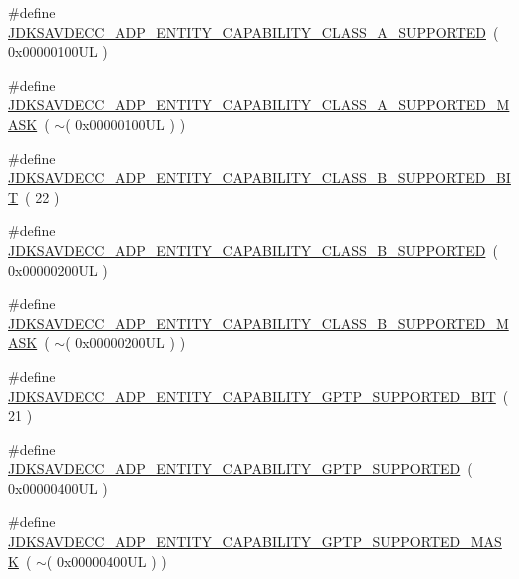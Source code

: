 \begin{DoxyCompactItemize}
\item 
\#define \hyperlink{group__adp__entity__capability_gaf87380e0bc48dfd9f2801b5735e37b4e}{J\+D\+K\+S\+A\+V\+D\+E\+C\+C\+\_\+\+A\+D\+P\+\_\+\+E\+N\+T\+I\+T\+Y\+\_\+\+C\+A\+P\+A\+B\+I\+L\+I\+T\+Y\+\_\+\+C\+L\+A\+S\+S\+\_\+\+A\+\_\+\+S\+U\+P\+P\+O\+R\+T\+ED}~( 0x00000100\+U\+L )
\item 
\#define \hyperlink{group__adp__entity__capability_ga10f4e8c58103317ae2fd13cca5627c3b}{J\+D\+K\+S\+A\+V\+D\+E\+C\+C\+\_\+\+A\+D\+P\+\_\+\+E\+N\+T\+I\+T\+Y\+\_\+\+C\+A\+P\+A\+B\+I\+L\+I\+T\+Y\+\_\+\+C\+L\+A\+S\+S\+\_\+\+A\+\_\+\+S\+U\+P\+P\+O\+R\+T\+E\+D\+\_\+\+M\+A\+SK}~( $\sim$( 0x00000100\+U\+L ) )
\item 
\#define \hyperlink{group__adp__entity__capability_ga6d92954f5579a213c5f1bbb650db3cfb}{J\+D\+K\+S\+A\+V\+D\+E\+C\+C\+\_\+\+A\+D\+P\+\_\+\+E\+N\+T\+I\+T\+Y\+\_\+\+C\+A\+P\+A\+B\+I\+L\+I\+T\+Y\+\_\+\+C\+L\+A\+S\+S\+\_\+\+B\+\_\+\+S\+U\+P\+P\+O\+R\+T\+E\+D\+\_\+\+B\+IT}~( 22 )
\item 
\#define \hyperlink{group__adp__entity__capability_ga97e8ba470921213edd5985cd658bb85f}{J\+D\+K\+S\+A\+V\+D\+E\+C\+C\+\_\+\+A\+D\+P\+\_\+\+E\+N\+T\+I\+T\+Y\+\_\+\+C\+A\+P\+A\+B\+I\+L\+I\+T\+Y\+\_\+\+C\+L\+A\+S\+S\+\_\+\+B\+\_\+\+S\+U\+P\+P\+O\+R\+T\+ED}~( 0x00000200\+U\+L )
\item 
\#define \hyperlink{group__adp__entity__capability_ga367dfa60ee4b57f99d1a1fa572dc648f}{J\+D\+K\+S\+A\+V\+D\+E\+C\+C\+\_\+\+A\+D\+P\+\_\+\+E\+N\+T\+I\+T\+Y\+\_\+\+C\+A\+P\+A\+B\+I\+L\+I\+T\+Y\+\_\+\+C\+L\+A\+S\+S\+\_\+\+B\+\_\+\+S\+U\+P\+P\+O\+R\+T\+E\+D\+\_\+\+M\+A\+SK}~( $\sim$( 0x00000200\+U\+L ) )
\item 
\#define \hyperlink{group__adp__entity__capability_ga64703efed5c25b4b2e9a74758ba11b3c}{J\+D\+K\+S\+A\+V\+D\+E\+C\+C\+\_\+\+A\+D\+P\+\_\+\+E\+N\+T\+I\+T\+Y\+\_\+\+C\+A\+P\+A\+B\+I\+L\+I\+T\+Y\+\_\+\+G\+P\+T\+P\+\_\+\+S\+U\+P\+P\+O\+R\+T\+E\+D\+\_\+\+B\+IT}~( 21 )
\item 
\#define \hyperlink{group__adp__entity__capability_gaf39226a31d10f4cb12894e5c4b7ac324}{J\+D\+K\+S\+A\+V\+D\+E\+C\+C\+\_\+\+A\+D\+P\+\_\+\+E\+N\+T\+I\+T\+Y\+\_\+\+C\+A\+P\+A\+B\+I\+L\+I\+T\+Y\+\_\+\+G\+P\+T\+P\+\_\+\+S\+U\+P\+P\+O\+R\+T\+ED}~( 0x00000400\+U\+L )
\item 
\#define \hyperlink{group__adp__entity__capability_gaf6c20f3f2ecb6ce7bd90955bea019200}{J\+D\+K\+S\+A\+V\+D\+E\+C\+C\+\_\+\+A\+D\+P\+\_\+\+E\+N\+T\+I\+T\+Y\+\_\+\+C\+A\+P\+A\+B\+I\+L\+I\+T\+Y\+\_\+\+G\+P\+T\+P\+\_\+\+S\+U\+P\+P\+O\+R\+T\+E\+D\+\_\+\+M\+A\+SK}~( $\sim$( 0x00000400\+U\+L ) )

\end{DoxyCompactItemize}
